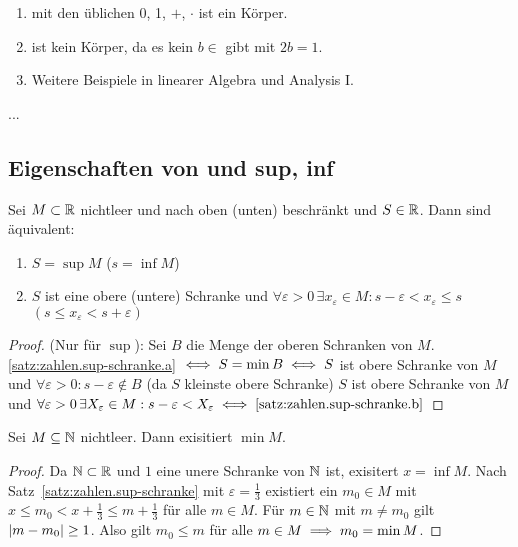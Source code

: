 \documentclass[12pt]{scrreprt}
\begin{document}
\begin{bsp*}
\begin{enumerate}
\item {} mit den üblichen 0, 1, $+$, $\cdot$ ist ein Körper.
\item {} ist kein Körper, da es kein $b \in$  gibt mit $2b = 1$.
\item Weitere Beispiele in linearer Algebra und Analysis I.
\end{enumerate}
\end{bsp*}

...
\subsection*{Eigenschaften von  und sup, inf}
\begin{satz}\label{satz:zahlen.sup-schranke}
Sei $M \subset \mathbb{R}$ nichtleer und nach oben (unten) beschränkt
und $S \in \mathbb{R}$. Dann sind äquivalent:
\begin{enumerate}
\item \label{satz:zahlen.sup-schranke.a} 
$S = \sup M$ ($s = \inf M$)
\item \label{satz:zahlen.sup-schranke.b}
$S$ ist eine obere (untere) Schranke und $\forall \varepsilon > 0\, \exists x_\varepsilon \in M: s - \varepsilon < x_\varepsilon \le s $ $( s \le x_\varepsilon < s+\varepsilon)$
\end{enumerate}
\end{satz}
\begin{proof}
(Nur für $\sup$):
Sei $B$ die Menge der oberen Schranken von $M$.
\ref{satz:zahlen.sup-schranke.a} $\iff S= \min B \iff S$ ist obere Schranke von $M$ und $\forall \varepsilon > 0 : s - \varepsilon \notin B$
(da $S$ kleinste obere Schranke) \gdw $S$ ist obere Schranke von $M$ und 
$\forall \varepsilon > 0\,\exists X_\varepsilon \in M: s-\varepsilon < X_\varepsilon \iff \ref{satz:zahlen.sup-schranke.b}$
\end{proof}

\begin{satz}\label{satz:zahlen.min-in-nat}
Sei $M \subseteq \mathbb{N}$ nichtleer. Dann exisitiert $\min M$.
\end{satz}
\begin{proof}
Da $\mathbb{N} \subset \mathbb{R}$ und $1$ eine unere Schranke von $\mathbb{N}$ ist,
exisitert $x = \inf M$. Nach Satz~\ref{satz:zahlen.sup-schranke} mit $\varepsilon = \frac{1}{3}$ existiert
ein $m_0 \in M$ mit $ x \le m_0 < x + \frac{1}{3} \le m + \frac{1}{3}$ für alle $ m \in M$.
Für $m \in \mathbb{N}$ mit $m \ne m_0$ gilt $\left\lvert m - m_0\right\lvert \ge 1$. Also gilt $m_0 \le m$ für alle $ m\in M \implies m_0 = \min M$.

\end{proof}
\end{document}
